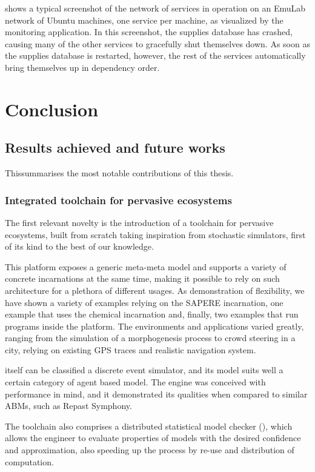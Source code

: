 \documentclass[12pt,a4paper,twoside,openright]{book}
\begin{document}
 shows a typical screenshot of the network of services in operation on an EmuLab network of Ubuntu machines, one service per machine, as visualized by the monitoring application.
%
In this screenshot, the supplies database has crashed, causing many of the other services to gracefully shut themselves down.  As soon as the supplies database is restarted, however, the rest of the services automatically bring themselves up in dependency order.

\part{Conclusion}
\label{conclusion-futureworks-part}
\chapter{Results achieved and future works}

This\levelText{}summarises the most notable contributions of this thesis.

\section{Integrated toolchain for pervasive ecosystems}

The first relevant novelty is the introduction of a toolchain for pervasive ecosystems, built from scratch taking inspiration from stochastic simulators, first of its kind to the best of our knowledge.

This platform exposes a generic meta-meta model and supports a variety of concrete incarnations at the same time, making it possible to rely on such architecture for a plethora of different usages.
%
As demonstration of flexibility, we have shown a variety of examples relying on the SAPERE incarnation, one example that uses the chemical incarnation and, finally, two examples that run \protelis{} programs inside the platform.
%
The environments and applications varied greatly, ranging from the simulation of a morphogenesis process to crowd steering in a city, relying on existing GPS traces and realistic navigation system.

\alchemist{} itself can be classified a discrete event simulator, and its model suits well a certain category of agent based model.
%
The engine was conceived with performance in mind, and it demonstrated its qualities when compared to similar ABMs, such as Repast Symphony.

The toolchain also comprises a distributed statistical model checker (\multivesta{}), which allows the engineer to evaluate properties of models with the desired confidence and approximation, also speeding up the process by re-use and distribution of computation.
\end{document}
